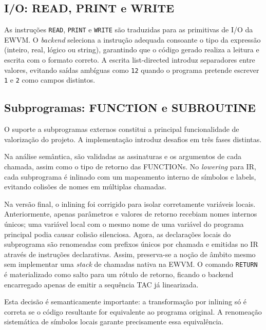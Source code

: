 \documentclass{article}
\begin{document}
\subsection{I/O: READ, PRINT e WRITE}

As instruções \texttt{READ}, \texttt{PRINT} e \texttt{WRITE} são traduzidas para as primitivas
de I/O da EWVM. O \textit{backend} seleciona a instrução adequada consoante o tipo da expressão
(inteiro, real, lógico ou string), garantindo que o código gerado realiza a leitura e escrita
com o formato correto. A escrita list-directed introduz separadores entre valores, evitando
saídas ambíguas como \texttt{12} quando o programa pretende escrever \texttt{1} e \texttt{2}
como campos distintos.

\subsection{Subprogramas: FUNCTION e SUBROUTINE}

O suporte a subprogramas externos constitui a principal funcionalidade de valorização do
projeto. A implementação introduz desafios em três fases distintas.

Na análise semântica, são validadas as assinaturas e os argumentos de cada chamada, assim
como o tipo de retorno das FUNCTIONs. No \textit{lowering} para IR, cada subprograma é
inlinado com um mapeamento interno de símbolos e labels, evitando colisões de nomes em
múltiplas chamadas.

Na versão final, o inlining foi corrigido para isolar corretamente variáveis locais.
Anteriormente, apenas parâmetros e valores de retorno recebiam nomes internos únicos; uma
variável local com o mesmo nome de uma variável do programa principal podia causar colisão
silenciosa. Agora, as declarações locais do subprograma são renomeadas com prefixos únicos
por chamada e emitidas no IR através de instruções declarativas. Assim, preserva-se a noção
de âmbito mesmo sem implementar uma \textit{stack} de chamadas nativa na EWVM. O
comando \texttt{RETURN} é materializado como salto para um rótulo de retorno, ficando o
backend encarregado apenas de emitir a sequência TAC já linearizada.

Esta decisão é semanticamente importante: a transformação por inlining só é correta se o
código resultante for equivalente ao programa original. A renomeação sistemática de símbolos
locais garante precisamente essa equivalência.
\end{document}
